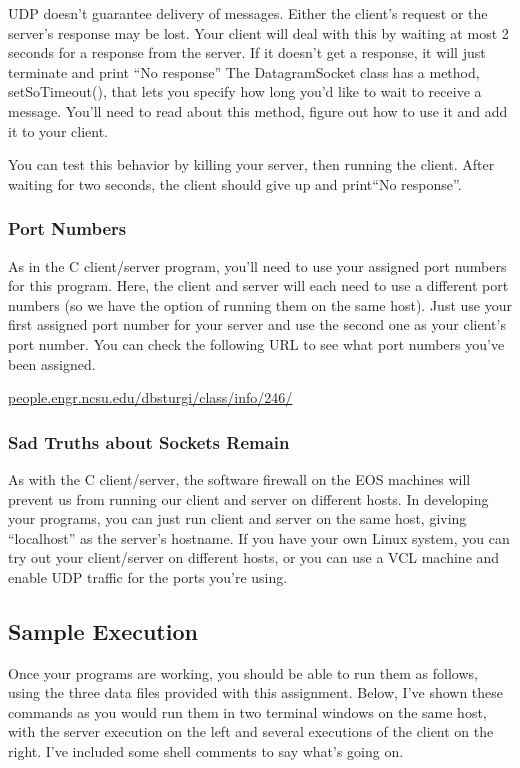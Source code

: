 \documentclass{article}
\begin{document}
\begin{enumerate}
  UDP doesn't guarantee delivery of messages.  Either the
  client's request or the server's response may be lost.  Your client
  will deal with this by waiting at most 2 seconds for a response from
  the server.  If it doesn't get a response, it will just terminate
  and print ``No response''  The DatagramSocket class has a method,
  setSoTimeout(), that lets you specify how long you'd like to wait to
  receive a message.  You'll need to read about this method, figure
  out how to use it and add it to your client.

  You can test this behavior by killing your server, then running the
  client.  After waiting for two seconds, the client should give up
  and print``No response''.

\subsubsection*{Port Numbers}

  As in the C client/server program, you'll need to use your assigned
  port numbers for this program.  Here, the client and server will
  each need to use a different port
  numbers (so we have the option of running them on the same host).
  Just use your first assigned port number for your server and use the
  second one as your client's port number.  You can check the
  following URL to see what port numbers you've been assigned.

\url{people.engr.ncsu.edu/dbsturgi/class/info/246/}

\subsubsection*{Sad Truths about Sockets Remain}

  As with the C client/server, the software firewall on the EOS
  machines will prevent us from running our client and server on
  different hosts.  In developing your programs, you can just run
  client and server on the same host, giving ``localhost'' as the
  server's hostname.  If you have your own Linux system, you can try
  out your client/server on different hosts, or you can use a VCL
  machine and enable UDP traffic for the ports you're using.

  \subsection*{Sample Execution}

  Once your programs are working, you should be able to run them as
  follows, using the three data files provided with this assignment.
  Below, I've shown these commands as you would run them in two
  terminal windows on the same host, with the server execution on the
  left and several executions of the client on the right.  I've included
  some shell comments to say what's going on.


\end{enumerate}
\end{document}
